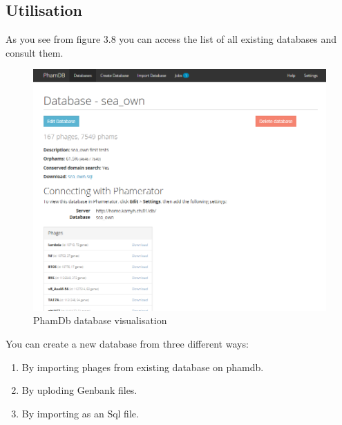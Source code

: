 \documentclass[a4paper,11pt]{report}
\begin{document}
\subsection{Utilisation}
As you see from figure 3.8 you can access the list of all existing databases and consult them.

\begin{figure}[H] 
	\begin{center}
		\includegraphics[scale=0.45]{img/phamdb_see_db}
		\caption{PhamDb database visualisation}
	\end{center}
\end{figure}

You can create a new database from three different ways:
\begin{enumerate}
	\item By importing phages from existing database on phamdb.
	\item By uploding Genbank files.
	\item By importing as an Sql file.
\end{enumerate}
\end{document}
